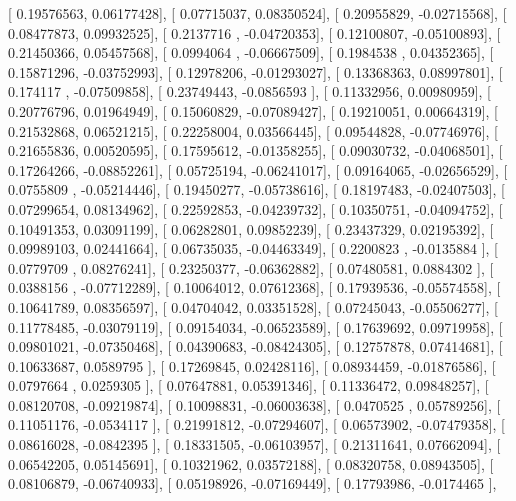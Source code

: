 \documentclass{article}
\begin{document}
       [ 0.19576563,  0.06177428],
       [ 0.07715037,  0.08350524],
       [ 0.20955829, -0.02715568],
       [ 0.08477873,  0.09932525],
       [ 0.2137716 , -0.04720353],
       [ 0.12100807, -0.05100893],
       [ 0.21450366,  0.05457568],
       [ 0.0994064 , -0.06667509],
       [ 0.1984538 ,  0.04352365],
       [ 0.15871296, -0.03752993],
       [ 0.12978206, -0.01293027],
       [ 0.13368363,  0.08997801],
       [ 0.174117  , -0.07509858],
       [ 0.23749443, -0.0856593 ],
       [ 0.11332956,  0.00980959],
       [ 0.20776796,  0.01964949],
       [ 0.15060829, -0.07089427],
       [ 0.19210051,  0.00664319],
       [ 0.21532868,  0.06521215],
       [ 0.22258004,  0.03566445],
       [ 0.09544828, -0.07746976],
       [ 0.21655836,  0.00520595],
       [ 0.17595612, -0.01358255],
       [ 0.09030732, -0.04068501],
       [ 0.17264266, -0.08852261],
       [ 0.05725194, -0.06241017],
       [ 0.09164065, -0.02656529],
       [ 0.0755809 , -0.05214446],
       [ 0.19450277, -0.05738616],
       [ 0.18197483, -0.02407503],
       [ 0.07299654,  0.08134962],
       [ 0.22592853, -0.04239732],
       [ 0.10350751, -0.04094752],
       [ 0.10491353,  0.03091199],
       [ 0.06282801,  0.09852239],
       [ 0.23437329,  0.02195392],
       [ 0.09989103,  0.02441664],
       [ 0.06735035, -0.04463349],
       [ 0.2200823 , -0.0135884 ],
       [ 0.0779709 ,  0.08276241],
       [ 0.23250377, -0.06362882],
       [ 0.07480581,  0.0884302 ],
       [ 0.0388156 , -0.07712289],
       [ 0.10064012,  0.07612368],
       [ 0.17939536, -0.05574558],
       [ 0.10641789,  0.08356597],
       [ 0.04704042,  0.03351528],
       [ 0.07245043, -0.05506277],
       [ 0.11778485, -0.03079119],
       [ 0.09154034, -0.06523589],
       [ 0.17639692,  0.09719958],
       [ 0.09801021, -0.07350468],
       [ 0.04390683, -0.08424305],
       [ 0.12757878,  0.07414681],
       [ 0.10633687,  0.0589795 ],
       [ 0.17269845,  0.02428116],
       [ 0.08934459, -0.01876586],
       [ 0.0797664 ,  0.0259305 ],
       [ 0.07647881,  0.05391346],
       [ 0.11336472,  0.09848257],
       [ 0.08120708, -0.09219874],
       [ 0.10098831, -0.06003638],
       [ 0.0470525 ,  0.05789256],
       [ 0.11051176, -0.0534117 ],
       [ 0.21991812, -0.07294607],
       [ 0.06573902, -0.07479358],
       [ 0.08616028, -0.0842395 ],
       [ 0.18331505, -0.06103957],
       [ 0.21311641,  0.07662094],
       [ 0.06542205,  0.05145691],
       [ 0.10321962,  0.03572188],
       [ 0.08320758,  0.08943505],
       [ 0.08106879, -0.06740933],
       [ 0.05198926, -0.07169449],
       [ 0.17793986, -0.0174465 ],
\end{document}
